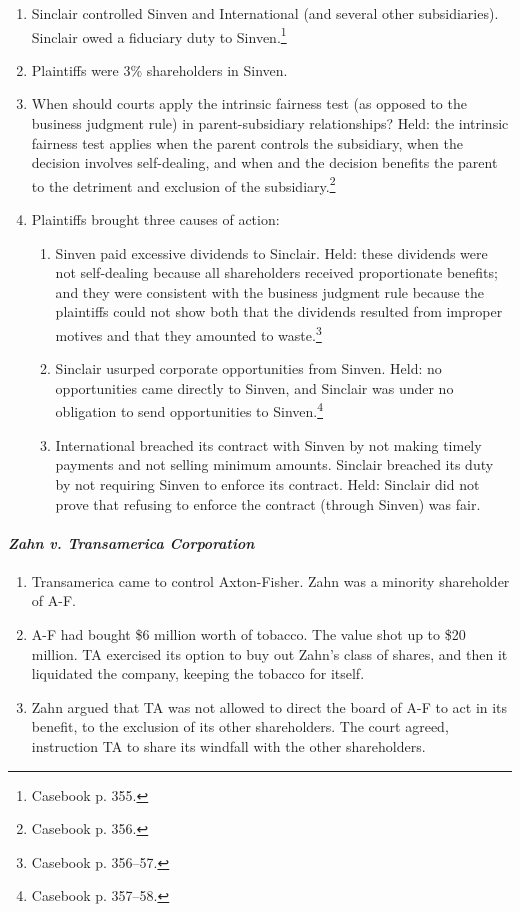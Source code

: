 \begin{enumerate}
    \item Sinclair controlled Sinven and International (and several other 
    subsidiaries). Sinclair owed a fiduciary duty to Sinven.\footnote{Casebook 
    p. 355.}
    \item Plaintiffs were 3\% shareholders in Sinven.
    \item When should courts apply the intrinsic fairness test (as opposed to 
    the business judgment rule) in parent-subsidiary relationships? Held: the 
    intrinsic fairness test applies when the parent controls the subsidiary, 
    when the decision involves self-dealing, and when and the decision 
    benefits the parent to the detriment and exclusion of the 
    subsidiary.\footnote{Casebook p. 356.}
    \item Plaintiffs brought three causes of action:
    \begin{enumerate}
        \item Sinven paid excessive dividends to Sinclair. Held: these 
        dividends were not self-dealing because all shareholders received 
        proportionate benefits; and they were consistent with the 
        business judgment rule because the plaintiffs could not show both that 
        the dividends resulted from improper motives and that they amounted to 
        waste.\footnote{Casebook p. 356--57.}
        \item Sinclair usurped corporate opportunities from Sinven. Held: no 
        opportunities came directly to Sinven, and Sinclair was under no 
        obligation to send opportunities to Sinven.\footnote{Casebook p. 
        357--58.}
        \item International breached its contract with Sinven by not making 
        timely payments and not selling minimum amounts. Sinclair breached its 
        duty by not requiring Sinven to enforce its contract. Held: Sinclair 
        did not prove that refusing to enforce the contract (through Sinven) 
        was fair.
    \end{enumerate}
\end{enumerate}

\paragraph{\emph{Zahn v. Transamerica Corporation}}

\begin{enumerate}
    \item Transamerica came to control Axton-Fisher. Zahn was a minority 
    shareholder of A-F.
    \item A-F had bought \$6 million worth of tobacco. The value shot up to 
    \$20 million. TA exercised its option to buy out Zahn's class of shares, 
    and then it liquidated the company, keeping the tobacco for itself.
    \item Zahn argued that TA was not allowed to direct the board of A-F to 
    act in its benefit, to the exclusion of its other shareholders. The court 
    agreed, instruction TA to share its windfall with the other shareholders.
\end{enumerate}

